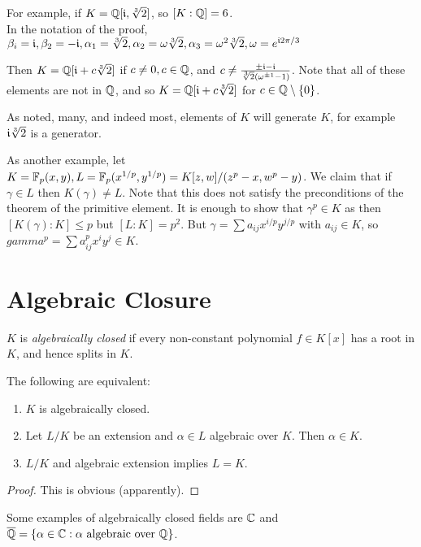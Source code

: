 \documentclass[10pt,a4paper]{article}
\begin{document}
For example, if $K = \mathbb{Q}[\mathfrak{i}, \sqrt[3]{2}]$, so $[K:\mathbb{Q}] = 6$.\\
In the notation of the proof, $\beta_i = \mathfrak{i}, \beta_2 = - \mathfrak{i}, \alpha_1 = \sqrt[3]{2}, \alpha_2 = \omega \sqrt[3]{2}, \alpha_3= \omega^2\sqrt[3]{2}, \omega=e^{\mathfrak{i}2\pi/3}$

Then $K=\mathbb{Q}[\mathfrak{i}+c\sqrt[3]{2}]$ if $c\neq 0, c \in \mathbb{Q}$, and $c \neq \frac{\pm\mathfrak{i}-\mathfrak{i}}{\sqrt[3]{2}(\omega^{\pm 1}-1)}$. Note that all of these elements are not in $\mathbb{Q}$, and so $K = \mathbb{Q}[\mathfrak{i}+c\sqrt[3]{2}]$ for $c\in \mathbb{Q}\setminus\{0\}$.

As noted, many, and indeed most, elements of $K$ will generate $K$, for example $\mathfrak{i}\sqrt[3]{2}$ is a generator.

As another example, let $K = \mathbb{F}_p(x,y), L = \mathbb{F}_p(x^{1/p}, y^{1/p}) = K[z,w]/(z^p-x, w^p-y)$. We claim that if $\gamma \in L$ then $K(\gamma) \neq L$. Note that this does not satisfy the preconditions of the theorem of the primitive element. It is enough to show that $\gamma^p \in K$ as then $[K(\gamma):K] \leq p$ but $[L:K] = p^2$. But $\gamma = \sum a_{ij}x^{i/p}y^{j/p}$ with $a_{ij} \in K$, so $gamma^p =\sum a_{ij}^p x^i y^j \in K$.

\section{Algebraic Closure}
$K$ is \emph{algebraically closed} if every non-constant polynomial $f \in K[x]$ has a root in $K$, and hence splits in $K$. 
\begin{lemma}
The following are equivalent:
\begin{enumerate}
\item $K$ is algebraically closed.
\item Let $L/K$ be an extension and $\alpha \in L$ algebraic over $K$. Then $\alpha \in K$.
\item $L/K$ and algebraic extension implies $L=K$.
\end{enumerate}
\end{lemma}
\begin{proof}
This is obvious (apparently).
\end{proof}
Some examples of algebraically closed fields are $\mathbb{C}$ and $\overline{\mathbb{Q}} = \{\alpha \in \mathbb{C} : \alpha \text{ algebraic over } \mathbb{Q}\}$.
\end{document}
